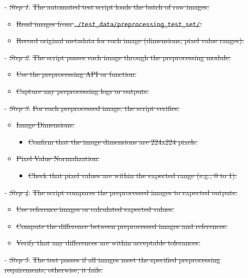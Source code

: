 \documentclass[12pt, titlepage]{article}
\begin{document}
\begin{enumerate}
\begin{enumerate}
\begin{enumerate}
\begin{itemize}
  \item[-] \textit{\sout{Step 1}}: \sout{The automated test script loads the batch of raw images:}
    \begin{itemize}
      \item \sout{Read images from \texttt{./test\_data/preprocessing\_test\_set/}.}
      \item \sout{Record original metadata for each image (dimensions, pixel value ranges).}
    \end{itemize}
  \item[-] \textit{\sout{Step 2}}: \sout{The script passes each image through the preprocessing module:}
    \begin{itemize}
      \item \sout{Use the preprocessing API or function.}
      \item \sout{Capture any preprocessing logs or outputs.}
    \end{itemize}
  \item[-] \textit{\sout{Step 3}}: \sout{For each preprocessed image, the script verifies:}
    \begin{itemize}
      \item \sout{Image Dimensions:}
        \begin{itemize}
          \item \sout{Confirm that the image dimensions are 224x224 pixels.}
        \end{itemize}
      \item \sout{Pixel Value Normalization:}
        \begin{itemize}
          \item \sout{Check that pixel values are within the expected range (e.g., 0 to 1).}
        \end{itemize}
    \end{itemize}
  \item[-] \textit{\sout{Step 4}}: \sout{The script compares the preprocessed images to expected outputs:}
    \begin{itemize}
      \item \sout{Use reference images or calculated expected values.}
      \item \sout{Compute the difference between preprocessed images and references.}
      \item \sout{Verify that any differences are within acceptable tolerances.}
    \end{itemize}
  \item[-] \textit{\sout{Step 5}}: \sout{The test passes if all images meet the specified preprocessing requirements; otherwise, it fails.}
\end{itemize}


\end{enumerate}
\end{enumerate}
\end{enumerate}
\end{document}
